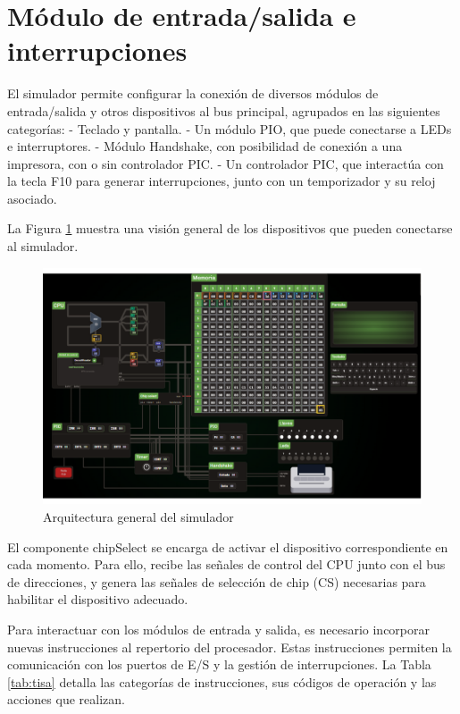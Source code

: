\documentclass[12pt,oneside]{templates/unerthesis}
\begin{document}
\hypertarget{muxf3dulo-de-entradasalida-e-interrupciones}{%
\section{Módulo de entrada/salida e interrupciones}\label{muxf3dulo-de-entradasalida-e-interrupciones}}

El simulador permite configurar la conexión de diversos módulos de entrada/salida y otros dispositivos al bus principal, agrupados en las siguientes categorías:
- Teclado y pantalla.
- Un módulo PIO, que puede conectarse a LEDs e interruptores.
- Módulo Handshake, con posibilidad de conexión a una impresora, con o sin controlador PIC.
- Un controlador PIC, que interactúa con la tecla F10 para generar interrupciones, junto con un temporizador y su reloj asociado.

La Figura \ref{fig:dispositivos} muestra una visión general de los dispositivos que pueden conectarse al simulador.

\begin{figure}

{\centering \includegraphics[width=1\linewidth]{images/esquemavonsim8} 

}

\caption{Arquitectura general del simulador}\label{fig:dispositivos}
\end{figure}

El componente chipSelect se encarga de activar el dispositivo correspondiente en cada momento. Para ello, recibe las señales de control del CPU junto con el bus de direcciones, y genera las señales de selección de chip (CS) necesarias para habilitar el dispositivo adecuado.

Para interactuar con los módulos de entrada y salida, es necesario incorporar nuevas instrucciones al repertorio del procesador. Estas instrucciones permiten la comunicación con los puertos de E/S y la gestión de interrupciones. La Tabla \ref{tab:tisa} detalla las categorías de instrucciones, sus códigos de operación y las acciones que realizan.
\end{document}
